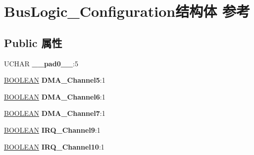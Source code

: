 \hypertarget{struct_bus_logic___configuration}{}\section{Bus\+Logic\+\_\+\+Configuration结构体 参考}
\label{struct_bus_logic___configuration}
\subsection*{Public 属性}
\begin{DoxyCompactItemize}
\item 
\mbox{\label{struct_bus_logic___configuration_a16a0ac2e0df020b52f9a8daecc8abb79}} 
U\+C\+H\+AR {\bfseries \+\_\+\+\_\+pad0\+\_\+\+\_\+}\+:5
\item 
\mbox{\label{struct_bus_logic___configuration_a6e626d9a255d4444f8541955993e3606}} 
\hyperlink{_processor_bind_8h_a112e3146cb38b6ee95e64d85842e380a}{B\+O\+O\+L\+E\+AN} {\bfseries D\+M\+A\+\_\+\+Channel5}\+:1
\item 
\mbox{\label{struct_bus_logic___configuration_a8a5ee9e01be5b74701fe1a66287803ca}} 
\hyperlink{_processor_bind_8h_a112e3146cb38b6ee95e64d85842e380a}{B\+O\+O\+L\+E\+AN} {\bfseries D\+M\+A\+\_\+\+Channel6}\+:1
\item 
\mbox{\label{struct_bus_logic___configuration_a33effc6df682d3a7eb018a1a5eb09f1e}} 
\hyperlink{_processor_bind_8h_a112e3146cb38b6ee95e64d85842e380a}{B\+O\+O\+L\+E\+AN} {\bfseries D\+M\+A\+\_\+\+Channel7}\+:1
\item 
\mbox{\label{struct_bus_logic___configuration_a72ddb78d4235f2f4d091748f99073b94}} 
\hyperlink{_processor_bind_8h_a112e3146cb38b6ee95e64d85842e380a}{B\+O\+O\+L\+E\+AN} {\bfseries I\+R\+Q\+\_\+\+Channel9}\+:1
\item 
\mbox{\label{struct_bus_logic___configuration_a8f61fdf57178524e4affd9b77bea86db}} 
\hyperlink{_processor_bind_8h_a112e3146cb38b6ee95e64d85842e380a}{B\+O\+O\+L\+E\+AN} {\bfseries I\+R\+Q\+\_\+\+Channel10}\+:1
\item 

\end{DoxyCompactItemize}
